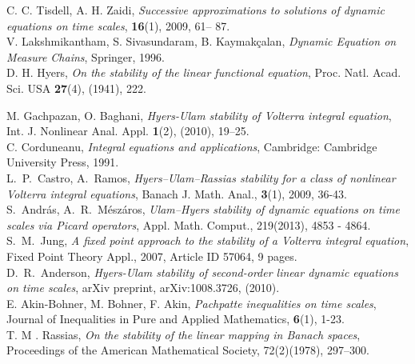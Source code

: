 \documentclass{article}
\begin{document}

\begin{thebibliography}{xx}
   C. C. Tisdell, A. H. Zaidi, \emph{Successive approximations to solutions of
dynamic equations on time scales}, \textbf{16}(1), 2009, 61-- 87.\\[-0.5cm]

  V. Lakshmikantham, S. Sivasundaram, B. Kaymakçalan, \emph{Dynamic Equation on Measure Chains}, Springer, 1996.\\[-0.5cm]

  D. H. Hyers, \emph{On the stability of the linear functional equation‏}, Proc. Natl. Acad. Sci. USA \textbf{27}(4), (1941), 222.

   M. Gachpazan, O. Baghani, \emph{Hyers-Ulam stability of Volterra integral equation}, Int. J. Nonlinear Anal. Appl. \textbf{1}(2), (2010), 19–25.\\[-0.5cm]

  C. Corduneanu, \emph{Integral equations and applications}, Cambridge: Cambridge University Press, 1991.\\[-0.5cm]
  L.~P.~Castro, A.~Ramos, \emph{Hyers–Ulam–Rassias stability for a class of nonlinear Volterra integral equations}‏, Banach J. Math. Anal., \textbf{3}(1), 2009, 36-43.\\[-0.5cm]

  S.~Andr\'{a}s, A.~R.~M\'{e}sz\'{a}ros, \emph{Ulam–Hyers stability of dynamic equations on time scales via Picard operators}, Appl. Math. Comput., 219(2013), 4853 - 4864.\\[-0.5cm]

      S.~M.~Jung, \emph{A fixed point approach to the stability of a Volterra integral equation}, Fixed
      Point Theory Appl., 2007, Article ID 57064, 9 pages. \\[-0.5cm]

      D.~R.~Anderson, \emph{Hyers-Ulam stability of second-order linear dynamic equations on time scales‏}, arXiv preprint, arXiv:1008.3726, (2010). \\[-0.5cm]

         E. Akin-Bohner, M. Bohner, F. Akin, \emph{Pachpatte inequalities on time scales}, Journal of Inequalities in Pure and Applied Mathematics, \textbf{6}(1), 1-23. \\[-0.5cm]

         T. M . Rassias, \emph{On the stability of the linear mapping in Banach spaces},
                   Proceedings of the American Mathematical Society, 72(2)(1978), 297–300.

\end{thebibliography}
\end{document}

